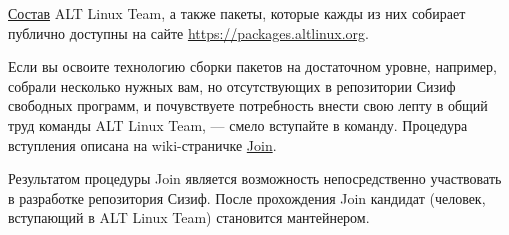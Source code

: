 \href{https://packages.altlinux.org/ru/sisyphus/maintainers/}{Состав} ALT Linux Team, 
а также пакеты, которые кажды из них собирает публично доступны на сайте \url{https://packages.altlinux.org}.

Если вы освоите технологию сборки пакетов на достаточном уровне, например, собрали несколько нужных вам, 
но отсутствующих в репозитории Сизиф свободных программ, и почувствуете потребность внести свою лепту 
в общий труд команды ALT Linux Team, --- смело вступайте в команду. Процедура вступления описана на 
wiki-страничке \href{https://altlinux.org/Join}{Join}.

Результатом процедуры Join является возможность непосредственно участвовать в разработке репозитория Сизиф. 
После прохождения Join кандидат (человек, вступающий в ALT Linux Team) становится мантейнером.
